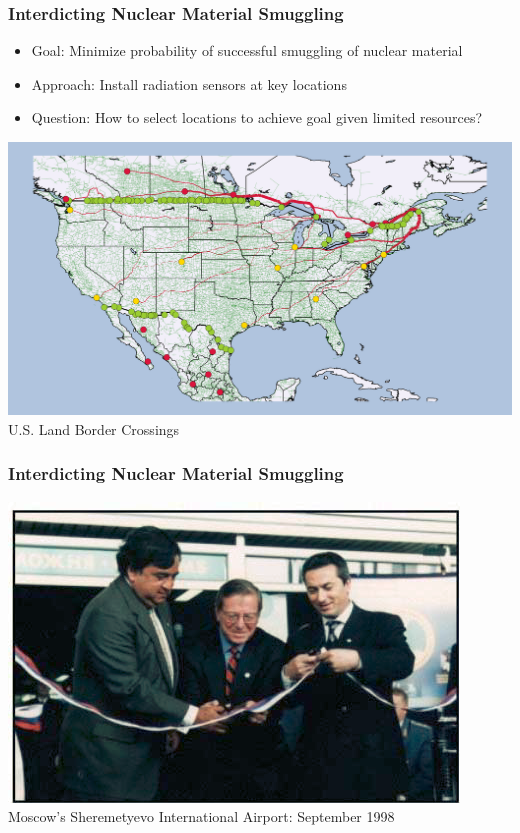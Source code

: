 \documentclass[12pt,handout]{beamer}
\begin{document}
\begin{frame}
\frametitle{Interdicting Nuclear Material Smuggling}
\begin{itemize}
\item Goal: Minimize probability of successful smuggling of nuclear material
\item Approach: Install radiation sensors at key locations
\item Question: How to select locations to achieve goal given limited resources?
\end{itemize}
\begin{center}
\includegraphics[scale=0.3]{checkpoints.png} \\
U.S. Land Border Crossings
\end{center}
\end{frame}
\begin{frame}
\frametitle{Interdicting Nuclear Material Smuggling}
\begin{center}
\includegraphics[scale=1]{ribbon_cutting.png} \\
Moscow's Sheremetyevo International Airport: September 1998
\end{center}
\end{frame}
\end{document}

